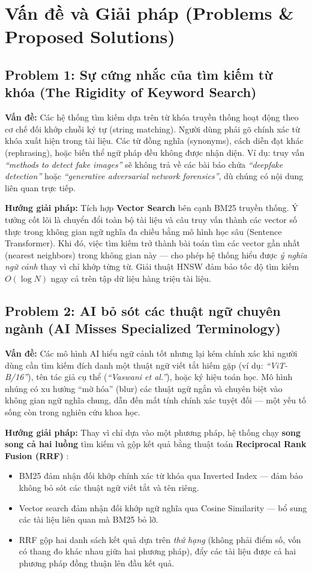 \chapter{Vấn đề và Giải pháp (Problems \& Proposed Solutions)}

\section{Problem 1: Sự cứng nhắc của tìm kiếm từ khóa (The Rigidity of Keyword Search)}
\textbf{Vấn đề:} Các hệ thống tìm kiếm dựa trên từ khóa truyền thống hoạt động theo cơ chế đối khớp chuỗi ký tự (string matching). Người dùng phải gõ chính xác từ khóa xuất hiện trong tài liệu. Các từ đồng nghĩa (synonyms), cách diễn đạt khác (rephrasing), hoặc biến thể ngữ pháp đều không được nhận diện. Ví dụ: truy vấn \textit{``methods to detect fake images''} sẽ không trả về các bài báo chứa \textit{``deepfake detection''} hoặc \textit{``generative adversarial network forensics''}, dù chúng có nội dung liên quan trực tiếp.

\textbf{Hướng giải pháp:} Tích hợp \textbf{Vector Search} bên cạnh BM25 truyền thống. Ý tưởng cốt lõi là chuyển đổi toàn bộ tài liệu và câu truy vấn thành các vector số thực trong không gian ngữ nghĩa đa chiều bằng mô hình học sâu (Sentence Transformer). Khi đó, việc tìm kiếm trở thành bài toán tìm các vector gần nhất (nearest neighbors) trong không gian này --- cho phép hệ thống hiểu được \textit{ý nghĩa ngữ cảnh} thay vì chỉ khớp từng từ. Giải thuật HNSW \cite{malkov2018hnsw} đảm bảo tốc độ tìm kiếm $O(\log N)$ ngay cả trên tập dữ liệu hàng triệu tài liệu.

\section{Problem 2: AI bỏ sót các thuật ngữ chuyên ngành (AI Misses Specialized Terminology)}
\textbf{Vấn đề:} Các mô hình AI hiểu ngữ cảnh tốt nhưng lại kém chính xác khi người dùng cần tìm kiếm đích danh một thuật ngữ viết tắt hiếm gặp (ví dụ: \textit{``ViT-B/16''}), tên tác giả cụ thể (\textit{``Vaswani et al.''}), hoặc ký hiệu toán học. Mô hình nhúng có xu hướng ``mờ hóa'' (blur) các thuật ngữ ngắn và chuyên biệt vào không gian ngữ nghĩa chung, dẫn đến mất tính chính xác tuyệt đối --- một yếu tố sống còn trong nghiên cứu khoa học.

\textbf{Hướng giải pháp:} Thay vì chỉ dựa vào một phương pháp, hệ thống chạy \textbf{song song cả hai luồng} tìm kiếm và gộp kết quả bằng thuật toán \textbf{Reciprocal Rank Fusion (RRF)} \cite{cormack2009rrf}:
\begin{itemize}
    \item BM25 đảm nhận đối khớp chính xác từ khóa qua Inverted Index --- đảm bảo không bỏ sót các thuật ngữ viết tắt và tên riêng.
    \item Vector search đảm nhận đối khớp ngữ nghĩa qua Cosine Similarity --- bổ sung các tài liệu liên quan mà BM25 bỏ lỡ.
    \item RRF gộp hai danh sách kết quả dựa trên \textit{thứ hạng} (không phải điểm số, vốn có thang đo khác nhau giữa hai phương pháp), đẩy các tài liệu được cả hai phương pháp đồng thuận lên đầu kết quả.
\end{itemize}

